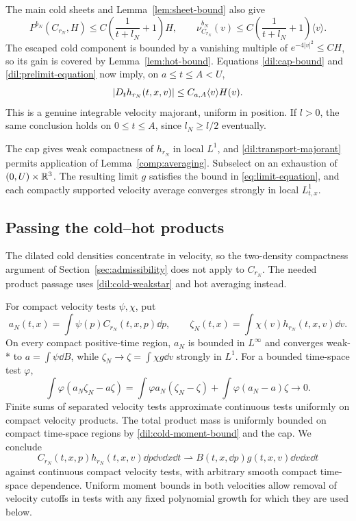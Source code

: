 The main cold sheets and Lemma~\ref{lem:sheet-bound} also give
\[
P^{b_N}(C_{r_N},H)\leq
 C\left(\frac1{t+l_N}+1\right)H,
\qquad
\nu^{b_N}_{C_{r_N}}(v)\leq
 C\left(\frac1{t+l_N}+1\right)\langle v\rangle.
\]
The escaped cold component is bounded by a vanishing multiple of
\(e^{-4|v|^2}\leq CH\), so its gain is covered by
Lemma~\ref{lem:hot-bound}. Equations \eqref{dil:cap-bound} and
\eqref{dil:prelimit-equation} now imply, on \(a\leq t\leq A<U\),
\begin{equation}\label{dil:transport-majorant}
|D_t h_{r_N}(t,x,v)|\leq C_{a,A}\langle v\rangle H(v).
\end{equation}
This is a genuine integrable velocity majorant, uniform in position.
If \(l>0\), the same conclusion holds on \(0\leq t\leq A\), since
\(l_N\geq l/2\) eventually.

The cap gives weak compactness of \(h_{r_N}\) in local \(L^1\),
and \eqref{dil:transport-majorant} permits application of
Lemma~\ref{comp:averaging}. Subselect on an exhaustion of
\((0,U)\times\mathbb R^3\). The resulting limit \(g\) satisfies the
bound in \eqref{eq:limit-equation}, and each compactly supported
velocity average converges strongly in local \(L^1_{t,x}\).

\subsection{Passing the cold--hot products}

The dilated cold densities concentrate in velocity, so the
two-density compactness argument of Section~\ref{sec:admissibility}
does not apply to \(C_{r_N}\). The needed product passage uses
\eqref{dil:cold-weakstar} and hot averaging instead.

For compact velocity tests \(\psi,\chi\), put
\[
a_N(t,x)=\int\psi(p)C_{r_N}(t,x,p)\dd p,\qquad
\zeta_N(t,x)=\int\chi(v)h_{r_N}(t,x,v)\dd v.
\]
On every compact positive-time region, \(a_N\) is bounded in
\(L^\infty\) and converges weak-* to
\(a=\int\psi\dd B\), while
\(\zeta_N\to\zeta=\int\chi g\dd v\)
strongly in \(L^1\). For a bounded time-space test \(\varphi\),
\[
\int\varphi(a_N\zeta_N-a\zeta)
=\int\varphi a_N(\zeta_N-\zeta)
 +\int\varphi(a_N-a)\zeta\longrightarrow0.
\]
Finite sums of separated velocity tests approximate continuous tests
uniformly on compact velocity products. The total product mass is
uniformly bounded on compact time-space regions by
\eqref{dil:cold-moment-bound} and the cap. We conclude
\begin{equation}\label{dil:mixed-product}
C_{r_N}(t,x,p)h_{r_N}(t,x,v)\dd p\dd v\dd x\dd t
\rightharpoonup B(t,x,\dd p)g(t,x,v)\dd v\dd x\dd t
\end{equation}
against continuous compact velocity tests, with arbitrary smooth
compact time-space dependence. Uniform moment bounds in both velocities
allow removal of velocity cutoffs in tests with any fixed polynomial
growth for which they are used below.

